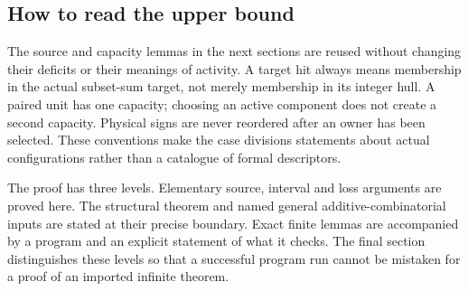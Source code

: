 \documentclass[11pt,letterpaper]{article}
\theoremstyle{definition}\newtheorem{definition}[theorem]{Definition}
\begin{document}
\subsection{How to read the upper bound}
The source and capacity lemmas in the next sections are reused without changing their deficits or their meanings of activity. A target hit always means membership in the actual subset-sum target, not merely membership in its integer hull. A paired unit has one capacity; choosing an active component does not create a second capacity. Physical signs are never reordered after an owner has been selected. These conventions make the case divisions statements about actual configurations rather than a catalogue of formal descriptors.

The proof has three levels. Elementary source, interval and loss arguments are proved here. The structural theorem and named general additive-combinatorial inputs are stated at their precise boundary. Exact finite lemmas are accompanied by a program and an explicit statement of what it checks. The final section distinguishes these levels so that a successful program run cannot be mistaken for a proof of an imported infinite theorem.
\end{document}

